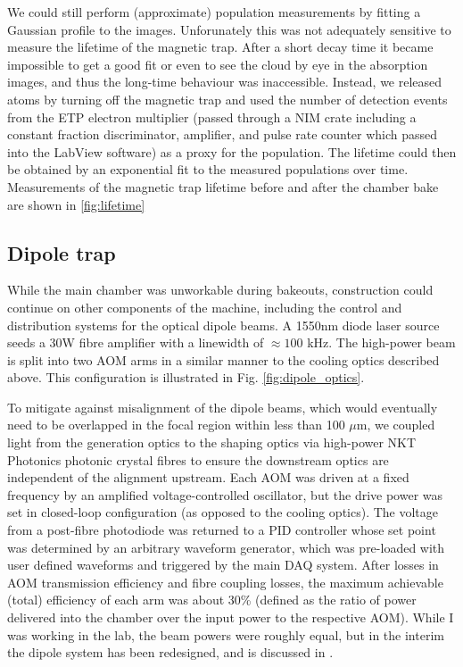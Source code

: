	We could still perform (approximate) population measurements by fitting a Gaussian profile to the images.
	Unforunately this was not adequately sensitive to measure the lifetime of the magnetic trap.
	After a short decay time it became impossible to get a good fit or even to see the cloud by eye in the absorption images, and thus the long-time behaviour was inaccessible.
	Instead, we released atoms by turning off the magnetic trap and used the number of detection events from the ETP electron multiplier (passed through a NIM crate including a constant fraction discriminator, amplifier, and pulse rate counter which passed into the LabView software) as a proxy for the population.
	The lifetime could then be obtained by an exponential fit to the measured populations over time.
	Measurements of the magnetic trap lifetime before and after the chamber bake are shown in \ref{fig:lifetime}


	
	

\subsection{Dipole trap}
	While the main chamber was unworkable during bakeouts, construction could continue on other components of the machine, including the control and distribution systems for the optical dipole beams.
	A 1550nm diode laser source seeds a 30W fibre amplifier with a linewidth of $\approx100$ kHz.
	The high-power beam is split into two AOM arms in a similar manner to the cooling optics described above.
	This configuration is illustrated  in Fig.	\ref{fig:dipole_optics}.
	
	To mitigate against misalignment of the dipole beams, which would eventually need to be overlapped in the focal region within less than 100 $\mu$m, we coupled light from the generation optics to the shaping optics via high-power NKT Photonics photonic crystal fibres to ensure the downstream optics are independent of the alignment upstream.
	Each AOM was driven at a fixed frequency by an amplified voltage-controlled oscillator, but the drive power was set in closed-loop configuration (as opposed to the cooling optics).
	The voltage from a post-fibre photodiode was returned to a PID controller whose set point was determined by an arbitrary waveform generator, which was pre-loaded with user defined waveforms and triggered by the main DAQ system.
	After losses in AOM transmission efficiency and fibre coupling losses, the maximum achievable (total) efficiency of each arm was about 30\% (defined as the ratio of power delivered into the chamber over the input power to the respective AOM).
	While I was working in the lab, the beam powers were roughly equal, but in the interim the dipole system has been redesigned, and is discussed in \cite{Abbas21}.

